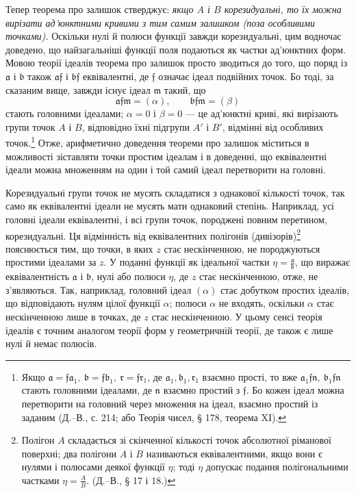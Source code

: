 \documentclass[11pt]{article}
\providecommand{\frf}{\mathfrak f}
\providecommand{\fra}{\mathfrak a}
\providecommand{\frb}{\mathfrak b}
\providecommand{\frr}{\mathfrak r}
\providecommand{\frm}{\mathfrak m}
\begin{document}
Тепер теорема про залишок стверджує: \emph{якщо \(A\) і \(B\) корезидуальні, то їх можна вирізати ад'юнктними кривими з тим самим залишком (поза особливими точками).} Оскільки нулі й полюси функції завжди корезидуальні, цим водночас доведено, що найзагальніші функції поля подаються як частки ад'юнктних форм. Мовою теорії ідеалів теорема про залишок просто зводиться до того, що поряд із \(\fra\) і \(\frb\) також \(\fra\frf\) і \(\frb\frf\) еквівалентні, де \(\frf\) означає ідеал подвійних точок. Бо тоді, за сказаним вище, завжди існує ідеал \(\frm\) такий, що
\[
\fra\frf\frm=(\alpha),\qquad \frb\frf\frm=(\beta)
\]
стають головними ідеалами; \(\alpha=0\) і \(\beta=0\) --- це ад'юнктні криві, які вирізають групи точок \(A\) і \(B\), відповідно їхні підгрупи \(A'\) і \(B'\), відмінні від особливих точок.\footnote{Якщо \(\fra=\frf\fra_1,\ \frb=\frf\frb_1,\ \frr=\frf\frr_1\), де \(\fra_1,\frb_1,\frr_1\) взаємно прості, то вже \(\fra_1\frf\mathfrak n,\ \frb_1\frf\mathfrak n\) стають головними ідеалами, де \(\mathfrak n\) взаємно простий з \(\frf\). Бо кожен ідеал можна перетворити на головний через множення на ідеал, взаємно простий із заданим (Д.--В., с. 214; або Теорія чисел, § 178, теорема XI).} Отже, арифметично доведення теореми про залишок міститься в можливості зіставляти точки простим ідеалам і в доведенні, що еквівалентні ідеали можна множенням на один і той самий ідеал перетворити на головні.

Корезидуальні групи точок не мусять складатися з однакової кількості точок, так само як еквівалентні ідеали не мусять мати однаковий степінь. Наприклад, усі головні ідеали еквівалентні, і всі групи точок, породжені повним перетином, корезидуальні. Ця відмінність від еквівалентних полігонів (дивізорів)\footnote{Полігон \(A\) складається зі скінченної кількості точок абсолютної ріманової поверхні; два полігони \(A\) і \(B\) називаються еквівалентними, якщо вони є нулями і полюсами деякої функції \(\eta\); тоді \(\eta\) допускає подання полігональними частками \(\eta=\frac{A}{B}\). (Д.--В., § 17 і 18.)} пояснюється тим, що точки, в яких \(z\) стає нескінченною, не породжуються простими ідеалами за \(z\). У поданні функції як ідеальної частки \(\eta=\frac{\fra}{\frb}\), що виражає еквівалентність \(\fra\) і \(\frb\), нулі або полюси \(\eta\), де \(z\) стає нескінченною, отже, не з'являються. Так, наприклад, головний ідеал \((\alpha)\) стає добутком простих ідеалів, що відповідають нулям цілої функції \(\alpha\); полюси \(\alpha\) не входять, оскільки \(\alpha\) стає нескінченною лише в точках, де \(z\) стає нескінченною. У цьому сенсі теорія ідеалів є точним аналогом теорії форм у геометричній теорії, де також є лише нулі й немає полюсів.
\end{document}
